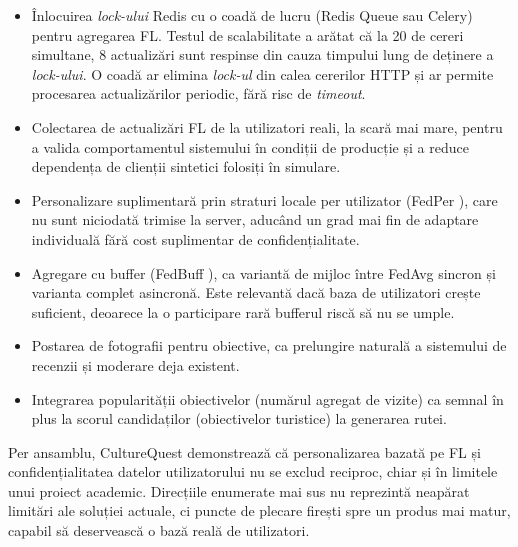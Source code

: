 \documentclass[12pt,a4paper]{report}
\begin{document}
\begin{itemize}
  \item Înlocuirea \textit{lock-ului} Redis cu o coadă de lucru (Redis Queue sau Celery) pentru agregarea FL. Testul de scalabilitate a arătat că la 20 de cereri simultane, 8 actualizări sunt respinse din cauza timpului lung de deținere a \textit{lock-ului}. O coadă ar elimina \textit{lock-ul} din calea cererilor HTTP și ar permite procesarea actualizărilor periodic, fără risc de \textit{timeout}.
  \item Colectarea de actualizări FL de la utilizatori reali, la scară mai mare, pentru a valida comportamentul sistemului în condiții de producție și a reduce dependența de clienții sintetici folosiți în simulare.
  \item Personalizare suplimentară prin straturi locale per utilizator (FedPer \cite{arivazhagan2019fedper}), care nu sunt niciodată trimise la server, aducând un grad mai fin de adaptare individuală fără cost suplimentar de confidențialitate.
  \item Agregare cu buffer (FedBuff \cite{nguyen2022fedbuff}), ca variantă de mijloc între FedAvg sincron și varianta complet asincronă. Este relevantă dacă baza de utilizatori crește suficient, deoarece la o participare rară bufferul riscă să nu se umple.
  \item Postarea de fotografii pentru obiective, ca prelungire naturală a sistemului de recenzii și moderare deja existent.
  \item Integrarea popularității obiectivelor (numărul agregat de vizite) ca semnal în plus la scorul candidaților (obiectivelor turistice) la generarea rutei.
\end{itemize}

Per ansamblu, CultureQuest demonstrează că personalizarea bazată pe FL și confidențialitatea datelor utilizatorului nu se exclud reciproc, chiar și în limitele unui proiect academic. Direcțiile enumerate mai sus nu reprezintă neapărat limitări ale soluției actuale, ci puncte de plecare firești spre un produs mai matur, capabil să deservească o bază reală de utilizatori.

\clearpage
{}
{}




\end{document}
